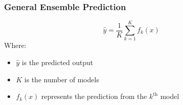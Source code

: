 \documentclass[aspectratio=169]{beamer}
\begin{document}
\begin{frame}[fragile]
    \frametitle{General Ensemble Prediction}
    \begin{equation}
        \hat{y} = \frac{1}{K}\sum_{k=1}^{K}f_k(x)
    \end{equation}
    Where:
    \begin{itemize}
        \item $\hat{y}$ is the predicted output
        \item $K$ is the number of models
        \item $f_k(x)$ represents the prediction from the $k^{\text{th}}$ model
    \end{itemize}
\end{frame}
\end{document}
